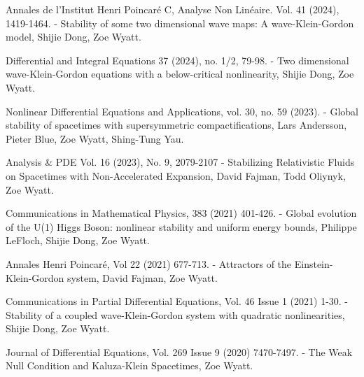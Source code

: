 \documentclass[12pt,a4paper]{article}
\begin{document}
Annales de l'Institut Henri Poincaré C, Analyse Non Linéaire. Vol. 41 (2024), 1419-1464.
- Stability of some two dimensional wave maps: A wave-Klein-Gordon model, Shijie Dong, Zoe Wyatt.

Differential and Integral Equations 37 (2024), no. 1/2, 79-98.
- Two dimensional wave-Klein-Gordon equations with a below-critical nonlinearity, Shijie Dong, Zoe Wyatt.

Nonlinear Differential Equations and Applications, vol. 30, no. 59 (2023).
- Global stability of spacetimes with supersymmetric compactifications, Lars Andersson, Pieter Blue, Zoe Wyatt, Shing-Tung Yau.

Analysis \& PDE Vol. 16 (2023), No. 9, 2079-2107
- Stabilizing Relativistic Fluids on Spacetimes with Non-Accelerated Expansion, David Fajman, Todd Oliynyk, Zoe Wyatt.

Communications in Mathematical Physics, 383 (2021) 401-426.
- Global evolution of the U(1) Higgs Boson: nonlinear stability and uniform energy bounds, Philippe LeFloch, Shijie Dong, Zoe Wyatt.

Annales Henri Poincaré, Vol 22 (2021) 677-713.
- Attractors of the Einstein-Klein-Gordon system, David Fajman, Zoe Wyatt.

Communications in Partial Differential Equations, Vol. 46 Issue 1 (2021) 1-30.
- Stability of a coupled wave-Klein-Gordon system with quadratic nonlinearities, Shijie Dong, Zoe Wyatt.

Journal of Differential Equations, Vol. 269 Issue 9 (2020) 7470-7497.
- The Weak Null Condition and Kaluza-Klein Spacetimes, Zoe Wyatt.
\end{document}
